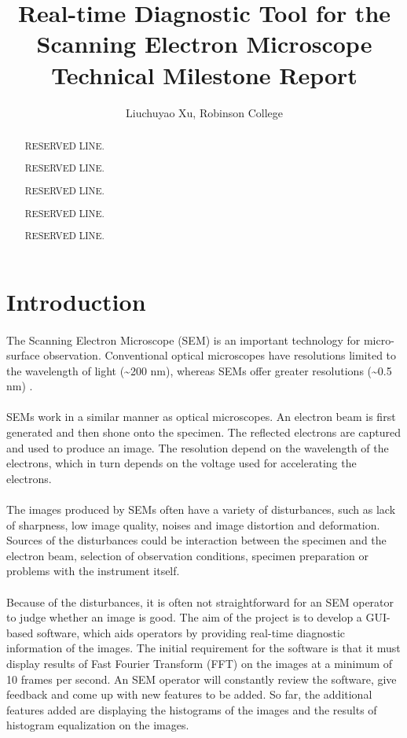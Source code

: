 \documentclass[12pt,a4paper]{article}
\title{Real-time Diagnostic Tool for the Scanning Electron Microscope Technical Milestone Report}
\author{Liuchuyao Xu, Robinson College}
\affil{Supervisor: Dr David Holburn}
\begin{document}
\maketitle

\begin{abstract}
RESERVED LINE.

RESERVED LINE.

RESERVED LINE.

RESERVED LINE.

RESERVED LINE.
\end{abstract}

\section{Introduction}
\paragraph{}
The Scanning Electron Microscope (SEM) is an important technology for micro-surface observation. Conventional optical microscopes have resolutions limited to the wavelength of light (\textasciitilde 200 nm), whereas SEMs offer greater resolutions (\textasciitilde 0.5 nm) \cite{JEOL}.

\paragraph{}
SEMs work in a similar manner as optical microscopes. An electron beam is first generated and then shone onto the specimen. The reflected electrons are captured and used to produce an image. The resolution depend on the wavelength of the electrons, which in turn depends on the voltage used for accelerating the electrons.

\paragraph{}
The images produced by SEMs often have a variety of disturbances, such as lack of sharpness, low image quality, noises and image distortion and deformation. Sources of the disturbances could be interaction between the specimen and the electron beam, selection of observation conditions, specimen preparation or problems with the instrument itself.

\paragraph{}
Because of the disturbances, it is often not straightforward for an SEM operator to judge whether an image is good. The aim of the project is to develop a GUI-based software, which aids operators by providing real-time diagnostic information of the images. The initial requirement for the software is that it must display results of Fast Fourier Transform (FFT) on the images at a minimum of 10 frames per second. An SEM operator will constantly review the software, give feedback and come up with new features to be added. So far, the additional features added are displaying the histograms of the images and the results of histogram equalization on the images.
\end{document}
